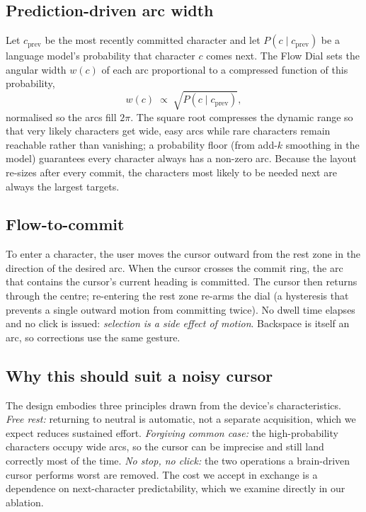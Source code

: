 \documentclass[manuscript,review,anonymous]{acmart}
\begin{document}
\subsection{Prediction-driven arc width}
Let $c_{\text{prev}}$ be the most recently committed character and let
$P(c \mid c_{\text{prev}})$ be a language model's probability that character $c$
comes next. The Flow Dial sets the angular width $w(c)$ of each arc proportional
to a compressed function of this probability,
\[
  w(c) \;\propto\; \sqrt{P(c \mid c_{\text{prev}})},
\]
normalised so the arcs fill $2\pi$. The square root compresses the dynamic range
so that very likely characters get wide, easy arcs while rare characters remain
reachable rather than vanishing; a probability floor (from add-$k$ smoothing in
the model) guarantees every character always has a non-zero arc. Because the
layout re-sizes after every commit, the characters most likely to be needed next
are always the largest targets.

\subsection{Flow-to-commit}
To enter a character, the user moves the cursor outward from the rest zone in
the direction of the desired arc. When the cursor crosses the commit ring, the
arc that contains the cursor's current heading is committed. The cursor then
returns through the centre; re-entering the rest zone re-arms the dial
(a hysteresis that prevents a single outward motion from committing twice). No
dwell time elapses and no click is issued: \emph{selection is a side effect of
motion}. Backspace is itself an arc, so corrections use the same gesture.

\subsection{Why this should suit a noisy cursor}
The design embodies three principles drawn from the device's characteristics.
\emph{Free rest:} returning to neutral is automatic, not a separate acquisition,
which we expect reduces sustained effort. \emph{Forgiving common case:} the
high-probability characters occupy wide arcs, so the cursor can be imprecise and
still land correctly most of the time. \emph{No stop, no click:} the two
operations a brain-driven cursor performs worst are removed. The cost we accept
in exchange is a dependence on next-character predictability, which we examine
directly in our ablation.
\end{document}
